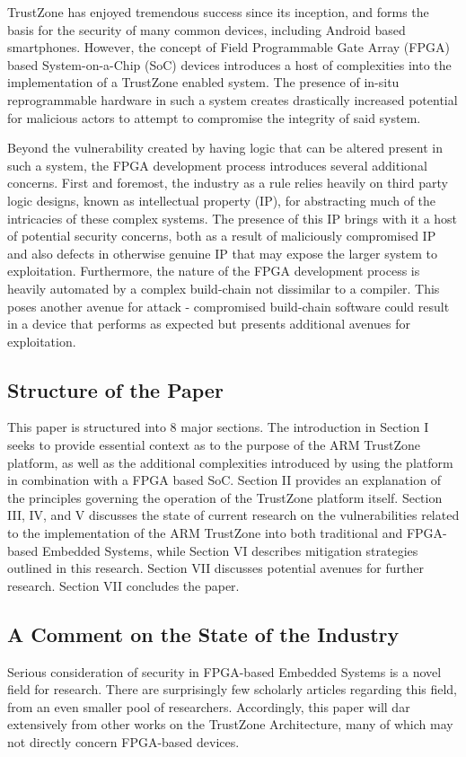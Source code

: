 \documentclass[journal]{IEEEtran}
\begin{document}
TrustZone has enjoyed tremendous success since its inception, and forms the basis for the
security of many common devices, including Android based smartphones. However, the concept
of Field Programmable Gate Array (FPGA) based System-on-a-Chip (SoC) devices introduces a
host of complexities into the implementation of a TrustZone enabled system. The
presence of in-situ reprogrammable hardware in such a system creates drastically increased
potential for malicious actors to attempt to compromise the integrity of said system.

Beyond the vulnerability created by having logic that can be altered present in such a
system, the FPGA development process introduces several additional concerns. First and
foremost, the industry as a rule relies heavily on third party logic designs, known as 
intellectual property (IP), for abstracting much of the intricacies of these complex 
systems. The presence of this IP brings with it a host of potential security concerns,
both as a result of maliciously compromised IP and also defects in otherwise genuine IP 
that may expose the larger system to exploitation. Furthermore, the nature of the FPGA
development process is heavily automated by a complex build-chain not dissimilar to a
compiler. This poses another avenue for attack - compromised build-chain software could
result in a device that performs as expected but presents additional avenues for
exploitation.

\subsection{Structure of the Paper}
This paper is structured into 8 major sections. The introduction in Section I seeks to
provide essential context as to the purpose of the ARM TrustZone platform, as well as the 
additional complexities introduced by using the platform in combination with a FPGA based 
SoC. Section II provides an explanation of the principles governing the operation of the 
TrustZone platform itself. Section III, IV, and V discusses the state of current research on
the vulnerabilities related to the implementation of the ARM TrustZone into both 
traditional and FPGA-based Embedded Systems, while Section VI describes mitigation
strategies outlined in this research. Section VII discusses potential avenues for further 
research. Section VII concludes the paper.

\subsection{A Comment on the State of the Industry}
Serious consideration of security in FPGA-based Embedded Systems is a novel field for
research. There are surprisingly few scholarly articles regarding this field, from an even
smaller pool of researchers. Accordingly, this paper will dar extensively from other works
on the TrustZone Architecture, many of which may not directly concern FPGA-based devices.
\end{document}
